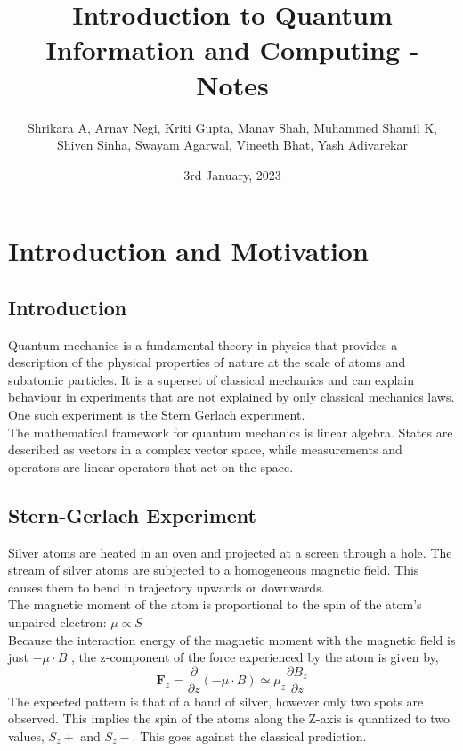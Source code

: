 \documentclass{article}
\title{Introduction to Quantum Information and Computing - Notes}
\author{Shrikara A, Arnav Negi, Kriti Gupta, Manav Shah, Muhammed Shamil K,\\ Shiven Sinha, Swayam Agarwal, Vineeth Bhat, Yash Adivarekar} %
\date{3rd January, 2023}
\begin{document}
\maketitle
\vfill
\tableofcontents
\newpage
{}


\section{Introduction and Motivation}
\subsection{Introduction}

Quantum mechanics is a fundamental theory in physics that provides a description of the physical properties of nature at the scale of atoms and subatomic particles. It is a superset of classical mechanics and can explain
behaviour in experiments that are not explained by only classical mechanics laws. One such experiment is
the Stern Gerlach experiment.\\

The mathematical framework for quantum mechanics is linear algebra. States are described as vectors in a complex
vector space, while measurements and operators are linear operators that act on the space.\\


\subsection{Stern-Gerlach Experiment}

Silver atoms are heated in an oven and projected at a screen through a hole. The stream of silver atoms
are subjected to a homogeneous magnetic field. This causes them to bend in trajectory upwards or downwards.\\

The magnetic moment of the atom is proportional to the spin of the atom's unpaired electron: $\mu \propto S$\\

Because the interaction energy of the magnetic moment with the magnetic field
is just $-\mu \cdot B$ , the z-component of the force experienced by the atom is given by,
$$\textbf{F}_z = \frac{\partial}{\partial z}(-\mu \cdot B) \simeq \mu_z\frac{\partial B_z}{\partial z}$$
The expected pattern is that of a band of silver, however only two spots are observed. This implies
the spin of the atoms along the Z-axis is quantized to two values, $S_z+$ and $S_z-$. This goes against the classical prediction.
\end{document}

